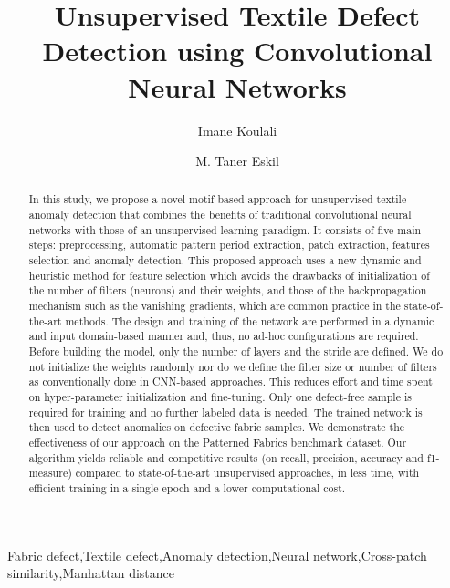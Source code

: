 \documentclass[3p,,preprint,review,12pt]{elsarticle}
\begin{document}
\begin{frontmatter}
	
\title{
    \textbf{Unsupervised Textile Defect Detection using Convolutional Neural Networks}    
}
    
\author[]{Imane Koulali}
\author[]{M. Taner Eskil}
    
\address{Department of Computer Science Engineering\unskip, 
    I{\c{s}}{\i}k University\unskip, B{\"{u}}y{\"{u}}kdere Ave.  No: 106, Maslak\unskip, 34398\unskip, Istanbul\unskip, Turkey}
  

\begin{abstract}
In this study, we propose a novel motif-based approach for unsupervised textile anomaly detection that combines the benefits of traditional convolutional neural networks with those of an unsupervised learning paradigm. It consists of five main steps:  preprocessing, automatic pattern period extraction, patch extraction, features selection and anomaly detection. This proposed approach uses a new dynamic and heuristic method for feature selection which avoids the drawbacks of initialization of the number of filters (neurons) and their weights, and those of the backpropagation mechanism such as the vanishing gradients, which are common practice in the state-of-the-art methods. The design and training of the network are performed in a dynamic and input domain-based manner and, thus, no ad-hoc configurations are required. Before building the model, only the number of layers and the stride are defined. We do not initialize the weights randomly nor do we define the filter size or number of filters as conventionally done in CNN-based approaches. This reduces effort and time spent on hyper-parameter initialization and fine-tuning. Only one defect-free sample is required for training and no further labeled data is needed. The trained network is then used to detect anomalies on defective fabric samples. We demonstrate the effectiveness of our approach on the Patterned Fabrics benchmark dataset. Our algorithm yields reliable and competitive results (on recall, precision, accuracy and f1-measure) compared to state-of-the-art unsupervised approaches, in less time, with efficient training in a single epoch and a lower computational cost.
\end{abstract}



\begin{keyword} 
Fabric defect\sep Textile defect\sep Anomaly detection\sep Neural network\sep Cross-patch similarity\sep Manhattan distance
\end{keyword}

\end{frontmatter}
    
\end{document}
